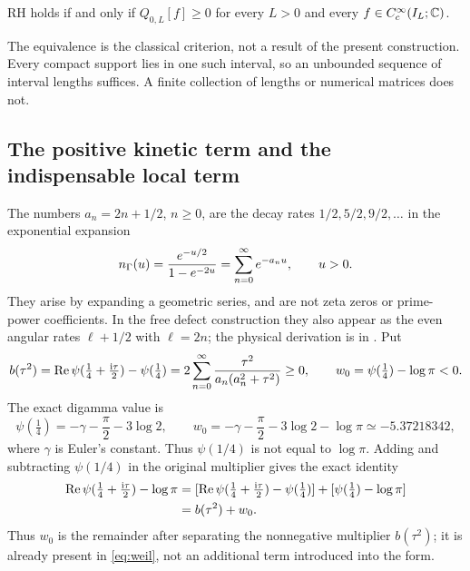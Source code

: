 \begin{theorem}\label{thm:weil}
RH holds if and only if $Q_{0,L}[f]\geq0$ for every $L>0$ and every
$f\in C_c^\infty(I_L;\mathbb C)$.
\end{theorem}
The equivalence is the classical criterion, not a result of the present
construction. Every compact support lies in one such interval, so an
unbounded sequence of interval lengths suffices. A finite collection of
lengths or numerical matrices does not.

\subsection{The positive kinetic term and the indispensable local term}

The numbers $a_n=2n+1/2$, $n\geq0$, are the decay rates
$1/2,5/2,9/2,\ldots$ in the exponential expansion
\begin{equation}\label{eq:intro-tower}
 n_\Gamma(u)=\frac{e^{-u/2}}{1-e^{-2u}}
 =\sum_{n=0}^\infty e^{-a_nu},\qquad u>0.
\end{equation}
They arise by expanding a geometric series, and are not zeta zeros
or prime-power coefficients. In the free defect construction they
also appear as the even angular rates $\ell+1/2$ with $\ell=2n$;
the physical derivation is in \cite[Section~S2]{Supplement}.
Put
\begin{equation}\label{eq:b-symbol}
 b(\tau^2)=\operatorname{Re}\psi(\tfrac14+\tfrac{\mathrm i\tau}2)-\psi(\tfrac14)
 =2\sum_{n=0}^\infty\frac{\tau^2}{a_n(a_n^2+\tau^2)}\geq0,
 \qquad w_0=\psi(\tfrac14)-\log\pi<0.
\end{equation}
The exact digamma value is
\begin{equation}
 \psi(\tfrac14)=-\gamma-\frac{\pi}{2}-3\log2,\qquad
 w_0=-\gamma-\frac{\pi}{2}-3\log2-\log\pi
       \simeq-5.37218342,
\end{equation}
where $\gamma$ is Euler's constant. Thus $\psi(1/4)$ is not equal
to $\log\pi$. Adding and
subtracting $\psi(1/4)$ in the original multiplier gives the exact identity
\begin{align}\label{eq:archimedean-split}
 \operatorname{Re}\psi(\tfrac14+\tfrac{\mathrm i\tau}2)-\log\pi
 &=[\operatorname{Re}\psi(\tfrac14+\tfrac{\mathrm i\tau}2)-\psi(\tfrac14)]
   +[\psi(\tfrac14)-\log\pi]\notag\\
 &=b(\tau^2)+w_0.
\end{align}
Thus $w_0$ is the remainder after separating the nonnegative multiplier
$b(\tau^2)$; it is already present in \eqref{eq:weil}, not an additional
term introduced into the form.

